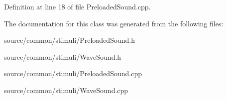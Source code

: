 Definition at line 18 of file Preloaded\-Sound.\-cpp.



The documentation for this class was generated from the following files\-:\begin{DoxyCompactItemize}
\item 
source/common/stimuli/Preloaded\-Sound.\-h\item 
source/common/stimuli/Wave\-Sound.\-h\item 
source/common/stimuli/Preloaded\-Sound.\-cpp\item 
source/common/stimuli/Wave\-Sound.\-cpp\end{DoxyCompactItemize}
